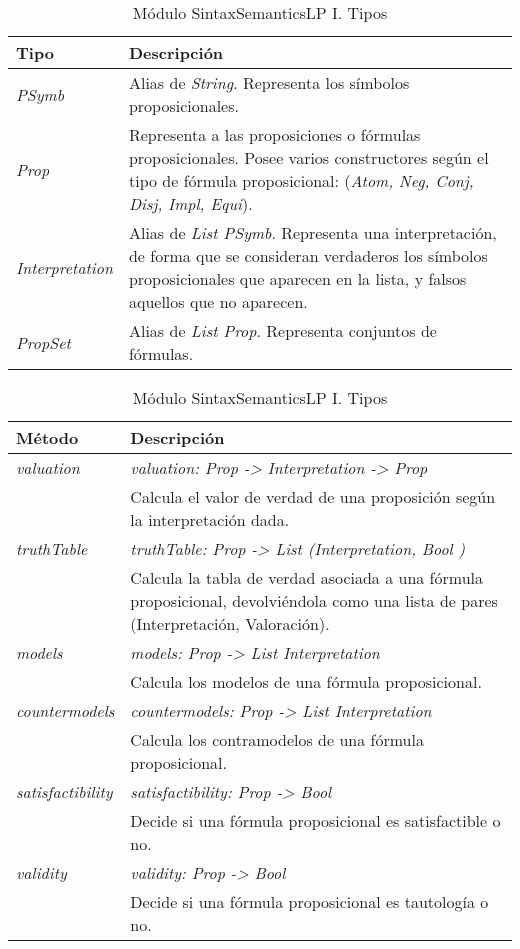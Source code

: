 \documentclass[a4paper]{report}
\begin{document}
\begin{table}[H]
\centering
\begin{tabular}{p{3cm} p{13.2cm}}
\hline
Tipo & Descripción\\
\hline
\hline
\textit{PSymb} & Alias de \textit{String}. Representa los símbolos proposicionales.\\
\hline
\textit{Prop}& Representa a las proposiciones o fórmulas proposicionales. Posee varios constructores según el tipo de fórmula proposicional: (\textit{Atom, Neg, Conj, Disj, Impl, Equi}).\\
\hline
\textit{Interpretation}& Alias de \textit{List PSymb}. Representa una interpretación, de forma que se consideran verdaderos los símbolos proposicionales que aparecen en la lista, y falsos aquellos que no aparecen.\\
\hline
\textit{PropSet}& Alias de \textit{List Prop}. Representa conjuntos de fórmulas.\\
\hline
\end{tabular}
\caption{Módulo SintaxSemanticsLP I. Tipos}
\vspace{0.5cm}
\begin{tabular}{p{3cm} p{13.2cm}}
\hline
Método & Descripción\\
\hline
\hline
\textit{valuation}& \textit{valuation: Prop -> Interpretation -> Prop}\\
& Calcula el valor de verdad de una proposición según la interpretación dada.\\
\hline
\textit{truthTable}& \textit{truthTable: Prop -> List (Interpretation, Bool
)}\\
& Calcula la tabla de verdad asociada a una fórmula proposicional, devolviéndola como una lista de pares (Interpretación, Valoración).\\
\hline
\textit{models}& \textit{models: Prop -> List Interpretation}\\
& Calcula los modelos de una fórmula proposicional.\\
\hline
\textit{countermodels}& \textit{countermodels: Prop -> List Interpretation}\\
& Calcula los contramodelos de una fórmula proposicional.\\
\hline
\textit{satisfactibility}& \textit{satisfactibility: Prop -> Bool}\\
& Decide si una fórmula proposicional es satisfactible o no.\\
\hline
\textit{validity}& \textit{validity: Prop -> Bool}\\
& Decide si una fórmula proposicional es tautología o no.\\

\end{tabular}
\end{table}
\end{document}
